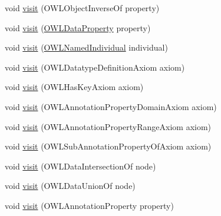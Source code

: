 \begin{DoxyCompactItemize}
\item 
void \hyperlink{classuk_1_1ac_1_1manchester_1_1cs_1_1owlapi_1_1dlsyntax_1_1_d_l_syntax_object_renderer_a8e3ebc4b46ebecb7001240521232604b}{visit} (O\-W\-L\-Object\-Inverse\-Of property)
\item 
void \hyperlink{classuk_1_1ac_1_1manchester_1_1cs_1_1owlapi_1_1dlsyntax_1_1_d_l_syntax_object_renderer_aae8dfc5312480fbc9cb2d5cb17423fba}{visit} (\hyperlink{interfaceorg_1_1semanticweb_1_1owlapi_1_1model_1_1_o_w_l_data_property}{O\-W\-L\-Data\-Property} property)
\item 
void \hyperlink{classuk_1_1ac_1_1manchester_1_1cs_1_1owlapi_1_1dlsyntax_1_1_d_l_syntax_object_renderer_a35f014b2d35577a1ee648b4d253b25c4}{visit} (\hyperlink{interfaceorg_1_1semanticweb_1_1owlapi_1_1model_1_1_o_w_l_named_individual}{O\-W\-L\-Named\-Individual} individual)
\item 
void \hyperlink{classuk_1_1ac_1_1manchester_1_1cs_1_1owlapi_1_1dlsyntax_1_1_d_l_syntax_object_renderer_a68aec45cb15ed10845f44afc08be52e5}{visit} (O\-W\-L\-Datatype\-Definition\-Axiom axiom)
\item 
void \hyperlink{classuk_1_1ac_1_1manchester_1_1cs_1_1owlapi_1_1dlsyntax_1_1_d_l_syntax_object_renderer_a234c03e1f94aa6f090508ee96a19c2f7}{visit} (O\-W\-L\-Has\-Key\-Axiom axiom)
\item 
void \hyperlink{classuk_1_1ac_1_1manchester_1_1cs_1_1owlapi_1_1dlsyntax_1_1_d_l_syntax_object_renderer_ac24804099c899fb2ff2eeec04387a850}{visit} (O\-W\-L\-Annotation\-Property\-Domain\-Axiom axiom)
\item 
void \hyperlink{classuk_1_1ac_1_1manchester_1_1cs_1_1owlapi_1_1dlsyntax_1_1_d_l_syntax_object_renderer_a2db882e7957099788cf9e19452451deb}{visit} (O\-W\-L\-Annotation\-Property\-Range\-Axiom axiom)
\item 
void \hyperlink{classuk_1_1ac_1_1manchester_1_1cs_1_1owlapi_1_1dlsyntax_1_1_d_l_syntax_object_renderer_a6f5fdc9a70bc64710e6b4bd2d67e2643}{visit} (O\-W\-L\-Sub\-Annotation\-Property\-Of\-Axiom axiom)
\item 
void \hyperlink{classuk_1_1ac_1_1manchester_1_1cs_1_1owlapi_1_1dlsyntax_1_1_d_l_syntax_object_renderer_a2e31753eba8253b9b8ea330b75d6eb57}{visit} (O\-W\-L\-Data\-Intersection\-Of node)
\item 
void \hyperlink{classuk_1_1ac_1_1manchester_1_1cs_1_1owlapi_1_1dlsyntax_1_1_d_l_syntax_object_renderer_ae3d9d58e62d09d97aa7770ae54ae2bb9}{visit} (O\-W\-L\-Data\-Union\-Of node)
\item 
void \hyperlink{classuk_1_1ac_1_1manchester_1_1cs_1_1owlapi_1_1dlsyntax_1_1_d_l_syntax_object_renderer_a65fdbeb4df5b3dd7bbf8872c57912e21}{visit} (O\-W\-L\-Annotation\-Property property)

\end{DoxyCompactItemize}
